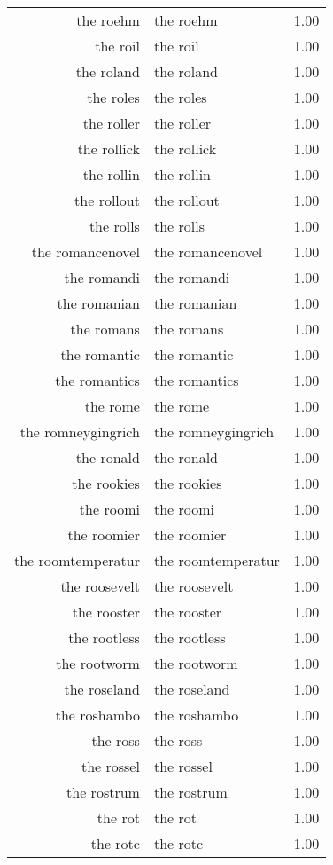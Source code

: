 \begin{table}[ht]
\begin{tabular}{rlr}
  the roehm & the roehm & 1.00 \\ 
  the roil & the roil & 1.00 \\ 
  the roland & the roland & 1.00 \\ 
  the roles & the roles & 1.00 \\ 
  the roller & the roller & 1.00 \\ 
  the rollick & the rollick & 1.00 \\ 
  the rollin & the rollin & 1.00 \\ 
  the rollout & the rollout & 1.00 \\ 
  the rolls & the rolls & 1.00 \\ 
  the romancenovel & the romancenovel & 1.00 \\ 
  the romandi & the romandi & 1.00 \\ 
  the romanian & the romanian & 1.00 \\ 
  the romans & the romans & 1.00 \\ 
  the romantic & the romantic & 1.00 \\ 
  the romantics & the romantics & 1.00 \\ 
  the rome & the rome & 1.00 \\ 
  the romneygingrich & the romneygingrich & 1.00 \\ 
  the ronald & the ronald & 1.00 \\ 
  the rookies & the rookies & 1.00 \\ 
  the roomi & the roomi & 1.00 \\ 
  the roomier & the roomier & 1.00 \\ 
  the roomtemperatur & the roomtemperatur & 1.00 \\ 
  the roosevelt & the roosevelt & 1.00 \\ 
  the rooster & the rooster & 1.00 \\ 
  the rootless & the rootless & 1.00 \\ 
  the rootworm & the rootworm & 1.00 \\ 
  the roseland & the roseland & 1.00 \\ 
  the roshambo & the roshambo & 1.00 \\ 
  the ross & the ross & 1.00 \\ 
  the rossel & the rossel & 1.00 \\ 
  the rostrum & the rostrum & 1.00 \\ 
  the rot & the rot & 1.00 \\ 
  the rotc & the rotc & 1.00 \\ 

\end{tabular}
\end{table}
